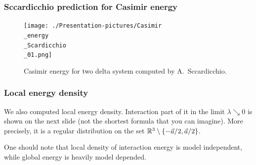 \documentclass[10pt,t]{beamer}
\begin{document}
\begin{frame}
  \frametitle{Sccardicchio prediction for Casimir energy}


  \begin{figure}

    \label{fig:Casimir-energy-Scardicchio}

    \centering


    \texttt{[image: ./Presentation-pictures/Casimir\\\_energy\\\_Scardicchio\\\_01.png]}

    \caption{Casimir energy for two delta system computed by
      A.~Sccardicchio.}


  \end{figure}

\end{frame}





\begin{frame}
  \frametitle{Local energy density}


  We also computed local energy density. Interaction part of it
  in the limit $\lambda \searrow 0$ is shown on the next slide (not the shortest
  formula that you can imagine). More precisely, it is a regular
  distribution on the set $\mathbb{R}^{ 3 } \setminus \{ -\vec{a} / 2, \vec{a} / 2\}$.

  One should note that local density of interaction energy is model
  \alert{independent}, while global energy is heavily model depended.

\end{frame}
\end{document}
